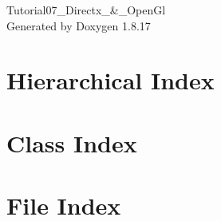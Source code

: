 \let\mypdfximage\pdfximage\def\pdfximage{\immediate\mypdfximage}\documentclass[twoside]{book}
\newcommand{\+}{\discretionary{\mbox{\scriptsize$\hookleftarrow$}}{}{}}
\newcommand{\clearemptydoublepage}{%
  \newpage{\pagestyle{empty}\cleardoublepage}%
}
\begin{document}
\hypersetup{pageanchor=false,
             bookmarksnumbered=true,
             pdfencoding=unicode
            }
\begin{titlepage}
\vspace*{7cm}
\begin{center}%
{\Large Tutorial07\+\_\+\+Directx\+\_\+\&\+\_\+\+Open\+Gl }\\
\vspace*{1cm}
{\large Generated by Doxygen 1.8.17}\\
\end{center}
\end{titlepage}
\clearemptydoublepage
{}
\tableofcontents
\clearemptydoublepage
{}
\hypersetup{pageanchor=true}

\chapter{Hierarchical Index}

\chapter{Class Index}

\chapter{File Index}

\end{document}
